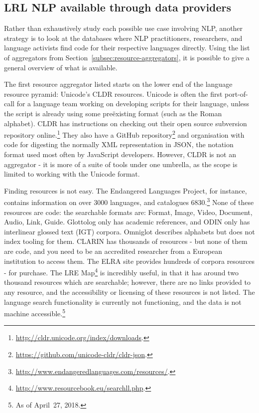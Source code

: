 \subsection{LRL NLP available through data providers}
\label{subsec:lrl-nlp-through-providers}

Rather than exhaustively study each possible use case involving NLP, another strategy is to look at the databases where NLP practitioners, researchers, and language activists find code for their respective languages directly. Using the list of aggregators from Section~\ref{subsec:resource-aggregators}, it is possible to give a general overview of what is available.

The first resource aggregator listed starts on the lower end of the language resource pyramid: Unicode's CLDR resources. Unicode is often the first port-of-call for a language team working on developing scripts for their language, unless the script is already using some  pre\"{e}xisting format (such as the Roman alphabet). CLDR has instructions on checking out their open source subversion repository online.\footnote{\href{http://cldr.unicode.org/index/downloads}{http://cldr.unicode.org/index/downloads}. } They also have a GitHub repository\footnote{\href{https://github.com/unicode-cldr/cldr-json}{https://github.com/unicode-cldr/cldr-json}. } and organisation with code for digesting the normally XML representation in JSON, the notation format used most often by JavaScript developers. However, CLDR is not an aggregator - it is more of a suite of tools under one umbrella, as the scope is limited to working with the Unicode format.

Finding resources is not easy. The Endangered Languages Project, for instance, contains information on over 3000 languages, and catalogues 6830.\footnote{\href{http://www.endangeredlanguages.com/resources/}{http://www.endangeredlanguages.com/resources/}. } None of these resources are code: the searchable formats are: Format, Image, Video, Document, Audio, Link, Guide. Glottolog only has academic references, and ODIN only has interlinear glossed text (IGT) corpora. Omniglot describes alphabets but does not index tooling for them. CLARIN has thousands of resources - but none of them are code, and you need to be an accredited researcher from a European institution to access them. The ELRA site provides hundreds of corpora resources - for purchase. The LRE Map\footnote{\href{http://www.resourcebook.eu/searchll.php}{http://www.resourcebook.eu/searchll.php}. } is incredibly useful, in that it has around two thousand resources which are searchable; however, there are no links provided to any resource, and the accessibility or licensing of these resources is not listed. The language search functionality is currently not functioning, and the data is not machine accessible.\footnote{As of April~27, 2018.}

